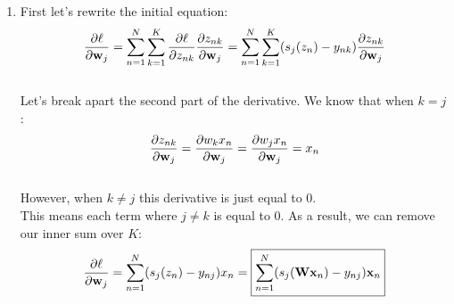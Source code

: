 \documentclass[submit]{harvardml}
\begin{document}
\begin{enumerate}
    \item First let's rewrite the initial equation:\\
    $$
    \frac{\partial \ell}{\partial \mathbf{w}_j} = \sum_{n = 1}^N\sum_{k = 1}^K\frac{\partial \ell}{\partial z_{nk}}\frac{\partial z_{nk}}{\partial \mathbf{w}_j} = \sum_{n = 1}^N\sum_{k = 1}^K(s_j(z_n)-y_{nk})\frac{\partial z_{nk}}{\partial \mathbf{w}_j}
    $$\\
    Let's break apart the second part of the derivative. We know that when $k=j$: $$\frac{\partial z_{nk}}{\partial \mathbf{w}_j} = \frac{\partial w_kx_n}{\partial \mathbf{w}_j} = \frac{\partial w_jx_n}{\partial \mathbf{w}_j} = x_n$$\\
    However, when $k\neq j$ this derivative is just equal to 0. \\
    This means each term where $j\neq k$ is equal to 0. As a result, we can remove our inner sum over $K$:\\
    $$\frac{\partial \ell}{\partial \mathbf{w}_j} = \sum_{n = 1}^N(s_j(z_n)-y_{nj})x_n =\boxed{ \sum_{n = 1}^N(s_j(\mathbf{W}\mathbf{x}_n) - y_{nj})\mathbf{x}_n}$$
    
    
\end{enumerate}

\end{document}

